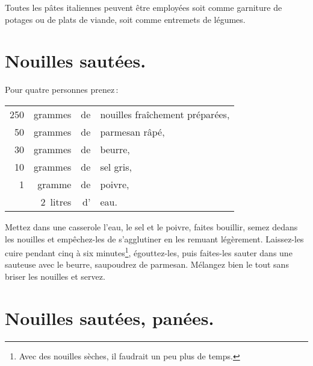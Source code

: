 \sk

Toutes les pâtes italiennes peuvent être employées soit comme garniture de
potages ou de plats de viande, soit comme entremets de légumes.

\section*{\centering Nouilles sautées.}
{}

Pour quatre personnes prenez :

\footnotesize
\begin{longtable}{rrrp{16em}}
    250 &  grammes & de & nouilles fraîchement préparées,                                                 \\
     50 &  grammes & de & parmesan râpé,                                                                  \\
     30 &  grammes & de & beurre,                                                                         \\
     10 &  grammes & de & sel gris,                                                                       \\
      1 &  gramme  & de & poivre,                                                                         \\
        & 2 litres & d' & eau.                                                                            \\
\end{longtable}
\normalsize

Mettez dans une casserole l'eau, le sel et le poivre, faites bouillir, semez
dedans les nouilles et empêchez-les de s'agglutiner en les remuant légèrement.
Laissez-les cuire pendant cinq à six minutes\footnote{Avec des nouilles sèches,
il faudrait un peu plus de temps.}, égouttez-les, puis faites-les sauter dans
une sauteuse avec le beurre, saupoudrez de parmesan. Mélangez bien le tout sans
briser les nouilles et servez.

\section*{\centering Nouilles sautées, panées.}
{}
\label{pg0681} \hypertarget{p0681}{}

